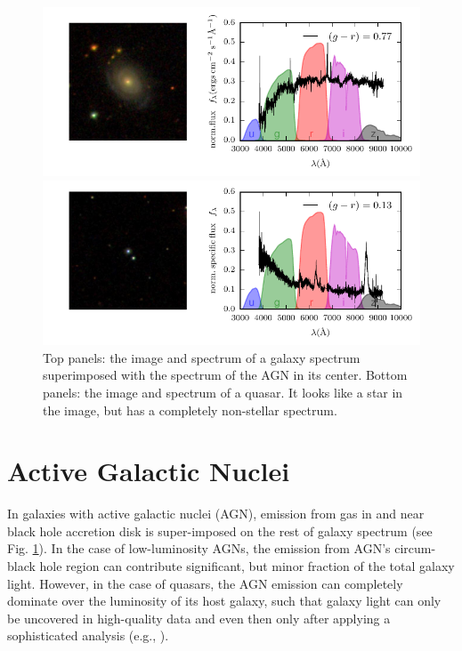 \begin{figure}[!ht]
\centerline{
\includegraphics[scale=1.25]{fig/gal_img_spec_1237665369572376858.pdf}}
\centerline{
\includegraphics[scale=1.25]{fig/gal_img_spec_1237662335719833753.pdf}}
\vspace{-5mm}
\caption{Top panels: the image and spectrum of a galaxy spectrum superimposed with the spectrum of the AGN in its center. Bottom panels: the image and spectrum of a quasar. It looks like a star in the image, but has a completely non-stellar spectrum. \label{fig:AGN_spectra}}
\end{figure}

\section{Active Galactic Nuclei}

In galaxies with active galactic nuclei (AGN), emission from gas in and near black hole accretion disk is super-imposed on the rest of galaxy spectrum (see Fig. \ref{fig:AGN_spectra}).  In the case of low-luminosity AGNs, the emission from AGN's circum-black hole region can contribute significant, but minor fraction of the total galaxy light. However, in the case of quasars, the AGN emission  
can completely dominate over the luminosity of its host galaxy, such that galaxy light can only be uncovered in high-quality data and even then only after applying a sophisticated analysis (e.g., \href{http://adsabs.harvard.edu/abs/1999ApJ...520...67K}{\citealt{kirhakos_etal99}}). 


